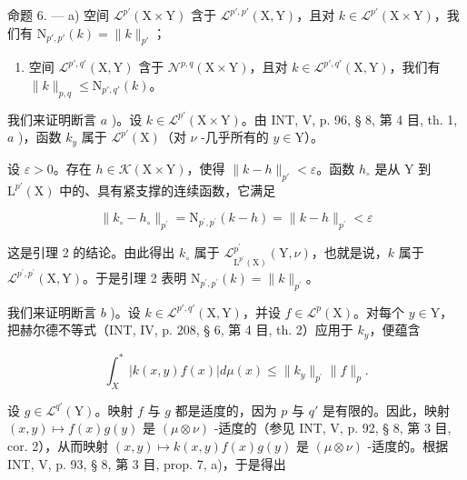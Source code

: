 命题 6. --- a) 空间 \(\mathcal{L}^{p'}(\mathrm{X} \times \mathrm{Y})\) 含于 \(\mathcal{L}^{p',p'}(\mathrm{X},\mathrm{Y})\)，且对 \(k \in \mathcal{L}^{p'}(\mathrm{X} \times \mathrm{Y})\)，我们有 \(\mathrm{N}_{p',p'}(k) = \| k\|_{p'}\)；

\begin{enumerate}
\def\labelenumi{\alph{enumi})}
\setcounter{enumi}{1}
\tightlist
\item
  空间 \(\mathcal{L}^{p',q'}(\mathrm{X},\mathrm{Y})\) 含于 \(\mathcal{N}^{p,q}(\mathrm{X}\times \mathrm{Y})\)，且对 \(k\in \mathcal{L}^{p',q'}(\mathrm{X},\mathrm{Y})\)，我们有 \(\| k\|_{p,q}\leqslant \mathrm{N}_{p',q'}(k)\)。
\end{enumerate}

我们来证明断言 \(a\) )。设 \(k \in \mathcal{L}^{p'}(\mathrm{X} \times \mathrm{Y})\)。由 INT, V, p. 96, § 8, 第 4 目, th. 1, \(a\) )，函数 \(k_y\) 属于 \(\mathcal{L}^{p'}(\mathrm{X})\)（对 \(\nu\) -几乎所有的 \(y \in \mathrm{Y}\)）。

设 \(\varepsilon > 0\)。存在 \(h \in \mathcal{K}(\mathrm{X} \times \mathrm{Y})\)，使得 \(\|k - h\|_{p'} < \varepsilon\)。函数 \(h_{\circ}\) 是从 Y 到 \(\mathrm{L}^{p'}(\mathrm{X})\) 中的、具有紧支撑的连续函数，它满足

\[
\| k _ {\circ} - h _ {\circ} \| _ {p ^ {\prime}} = \mathrm{N} _ {p ^ {\prime}, p ^ {\prime}} (k - h) = \| k - h \| _ {p ^ {\prime}} <   \varepsilon
\]

这是引理 2 的结论。由此得出 \(k_{\circ}\) 属于 \(\mathcal{L}_{\mathrm{L}^{p^{\prime}}(\mathrm{X})}^{p^{\prime}}(\mathrm{Y},\nu)\)，也就是说，\(k\) 属于 \(\mathcal{L}^{p^{\prime},p^{\prime}}(\mathrm{X},\mathrm{Y})\)。于是引理 2 表明 \(\mathrm{N}_{p^{\prime},p^{\prime}}(k)=\|k\|_{p^{\prime}}\)。

我们来证明断言 \(b\) )。设 \(k \in \mathcal{L}^{p', q'}(\mathrm{X}, \mathrm{Y})\)，并设 \(f \in \mathcal{L}^p(\mathrm{X})\)。对每个 \(y \in \mathrm{Y}\)，把赫尔德不等式（INT, IV, p. 208, § 6, 第 4 目, th. 2）应用于 \(k_y\)，便蕴含

\[
\int_ {X} ^ {*} | k (x, y) f (x) | d \mu (x) \leqslant \| k _ {y} \| _ {p ^ {\prime}} \| f \| _ {p}.
\]

设 \(g \in \mathcal{L}^{q'}(\mathrm{Y})\)。映射 \(f\) 与 \(g\) 都是适度的，因为 \(p\) 与 \(q'\) 是有限的。因此，映射 \((x,y) \mapsto f(x)g(y)\) 是 \((\mu \otimes \nu)\) -适度的（参见 INT, V, p. 92, § 8, 第 3 目, cor. 2），从而映射 \((x,y)\mapsto k(x,y)f(x)g(y)\) 是 \((\mu\otimes\nu)\) -适度的。根据 INT, V, p. 93, § 8, 第 3 目, prop. 7, a)，于是得出

